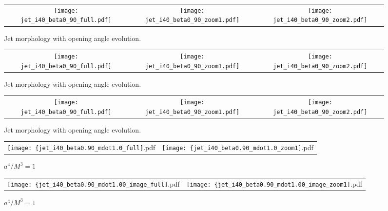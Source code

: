\documentclass[iop]{emulateapj}
\begin{document}
\begin{figure*}
\begin{center}
  \begin{tabular}{ccc}
    \texttt{[image: jet\_i40\_beta0\_90\_full.pdf]} &
    \texttt{[image: jet\_i40\_beta0\_90\_zoom1.pdf]} &
    \texttt{[image: jet\_i40\_beta0\_90\_zoom2.pdf]}
  \end{tabular}
\end{center}
\caption{Jet morphology with opening angle evolution.}
\label{fig:jet_psi}
\end{figure*}

\begin{figure*}
\begin{center}
  \begin{tabular}{ccc}
    \texttt{[image: jet\_i40\_beta0\_90\_full.pdf]} &
    \texttt{[image: jet\_i40\_beta0\_90\_zoom1.pdf]} &
    \texttt{[image: jet\_i40\_beta0\_90\_zoom2.pdf]}
  \end{tabular}
\end{center}
\caption{Jet morphology with opening angle evolution.}
\label{fig:jet_psi}
\end{figure*}

\begin{figure*}
\begin{center}
  \begin{tabular}{ccc}
    \texttt{[image: jet\_i40\_beta0\_90\_full.pdf]} &
    \texttt{[image: jet\_i40\_beta0\_90\_zoom1.pdf]} &
    \texttt{[image: jet\_i40\_beta0\_90\_zoom2.pdf]}
  \end{tabular}
\end{center}
\caption{Jet morphology with opening angle evolution.}
\label{fig:jet_psi}
\end{figure*}

\begin{figure*}
\begin{center}
  \begin{tabular}{cc}
    \texttt{[image: \{jet\_i40\_beta0.90\_mdot1.0\_full]}.pdf} &
    \texttt{[image: \{jet\_i40\_beta0.90\_mdot1.0\_zoom1]}.pdf} 
  \end{tabular}
\end{center}
\caption{$a^4/M^3=1$}
\label{fig:jet_mdot1.0}
\end{figure*}

\begin{figure*}
\begin{center}
  \begin{tabular}{cc}
    \texttt{[image: \{jet\_i40\_beta0.90\_mdot1.00\_image\_full]}.pdf} &
    \texttt{[image: \{jet\_i40\_beta0.90\_mdot1.00\_image\_zoom1]}.pdf} 
  \end{tabular}
\end{center}
\caption{$a^4/M^3=1$}
\label{fig:jet_mdot1.0_image}
\end{figure*}
\end{document}

